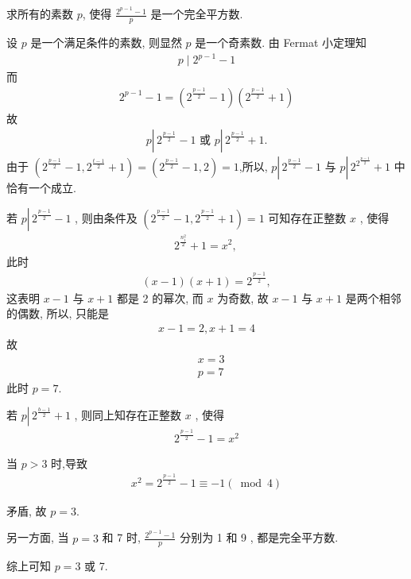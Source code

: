 \begin{example}
	求所有的素数 $p$, 使得 $\frac{2^{p-1}-1}{p}$ 是一个完全平方数.
\end{example}
\begin{solution}
	设 $p$ 是一个满足条件的素数, 则显然 $p$ 是一个奇素数. 由 Fermat 小定理知
	\begin{align*}
		p \mid 2^{p-1}-1
	\end{align*}
	而
	\begin{align*}
		2^{p-1}-1=\left(2^{\frac{p-1}{2}}-1\right)\left(2^{\frac{p-1}{2}}+1\right)
	\end{align*}
	故
	\begin{align*}
		p \left\lvert\, 2^{\frac{p-1}{2}}-1\right. \text { 或 } p \left\lvert\, 2^{\frac{p-1}{2}}+1 .\right.
	\end{align*}
	由于 $\left(2^{\frac{p-1}{2}}-1,2^{\frac{t-1}{2}}+1\right)=\left(2^{\frac{p-1}{2}}-1,2\right)=1$,所以,  $p \left\lvert\, 2^{\frac{p-1}{2}}-1\right.$ 与 $p \left\lvert\, 2^{2^{\frac{p-1}{2}}}+1\right.$ 中恰有一个成立.

	若 $p \left\lvert\, 2^{\frac{p-1}{2}}-1\right.$ , 则由条件及 $\left(2^{\frac{p-1}{2}}-1,2^{\frac{p-1}{2}}+1\right)=1$ 可知存在正整数 $x$ , 使得
	\begin{align*}
		2^{\frac{n_{1}^{2}}{2}}+1=x^{2} \text {, }
	\end{align*}
	此时
	\begin{align*}
		(x-1)(x+1)=2^{\frac{p-1}{2}},
	\end{align*}
	这表明 $x-1$ 与 $x+1$ 都是 2 的幂次, 而 $x$ 为奇数, 故 $x-1$ 与 $x+1$ 是两个相邻的偶数, 所以, 只能是
	\begin{align*}
		x-1=2, x+1=4
	\end{align*}
	故
	\begin{align*}
		 & x=3 \\
		 & p=7
	\end{align*}
	此时 $p=7$.

	若 $p \left\lvert\, 2^{\frac{b-1}{2}}+1\right.$ , 则同上知存在正整数 $x$ , 使得
	\begin{align*}
		2^{\frac{p-1}{2}}-1=x^{2}
	\end{align*}

	当 $p>3$ 时,导致
	\begin{align*}
		x^{2}=2^{\frac{p-1}{2}}-1 \equiv-1(\bmod 4)
	\end{align*}

	矛盾, 故 $p=3$.

	另一方面, 当 $p=3$ 和 7 时,  $\frac{2^{p-1}-1}{p}$ 分别为 1 和 9 , 都是完全平方数.

	综上可知 $p=3$ 或 7.
\end{solution}

